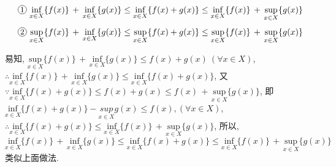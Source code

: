 \begin{enumerate}
	$$\circled{1}
	\underset{x\in X}{\mathrm{inf}}\{f(x)\}\,+\,\underset{x\in X}{\mathrm{inf}}\{g(x)\} \le
	\underset{x\in X}{\mathrm{inf}}\{f(x)+g(x)\} \le 	\underset{x\in X}{\mathrm{inf}}\{f(x)\}\,+\,\underset{x\in X}{\mathrm{sup}}\{g(x)\}
	$$ 
	$$\circled{2}
		\underset{x\in X}{\mathrm{sup}}\{f(x)\}\,+\,\underset{x\in X}{\mathrm{inf}}\{g(x)\} \le 	\underset{x\in X}{\mathrm{sup}}\{f(x)+g(x)\} \le \underset{x\in X}{\mathrm{sup}}\{f(x)\}\,+\,	\underset{x\in X}{\mathrm{sup}}\{g(x)\}
	$$
	\begin{solution}
		\textcolor{green}{} 易知, $\underset{x\in X}{\mathrm{sup}}\{f(x)\}\,+\,\underset{x\in X}{\mathrm{inf}}\{g(x)\}\le f(x)+g(x)\ (\forall x \in X)$, $\therefore \underset{x\in X}{\mathrm{inf}}\{f(x)\}\,+\,\underset{x\in X}{\mathrm{inf}}\{g(x)\} \le
		\underset{x\in X}{\mathrm{inf}}\{f(x)+g(x)\}$, 又$\because \underset{x\in X}{\mathrm{inf}}\{f(x)+g(x)\} \le f(x)+g(x) \le f(x)\,+\,\underset{x\in X}{\mathrm{sup}}\{g(x)\} $, 即$\underset{x\in X}{\mathrm{inf}}\{f(x)+g(x)\} - \underset{x\in X}{sup}g(x)\le f(x), (\forall x \in X)$, $\therefore \underset{x\in X}{\mathrm{inf}}\{f(x)+g(x)\} \le 	\underset{x\in X}{\mathrm{inf}}\{f(x)\}\,+\,\underset{x\in X}{\mathrm{sup}}\{g(x)\}$, 所以,
		$
		\underset{x\in X}{\mathrm{inf}}\{f(x)\}\,+\,\underset{x\in X}{\mathrm{inf}}\{g(x)\} \le
		\underset{x\in X}{\mathrm{inf}}\{f(x)+g(x)\} \le 	\underset{x\in X}{\mathrm{inf}}\{f(x)\}\,+\,\underset{x\in X}{\mathrm{sup}}\{g(x)\}
		$
		\textcolor{green}{} 类似上面做法.

		
	\end{solution}
\end{enumerate}

